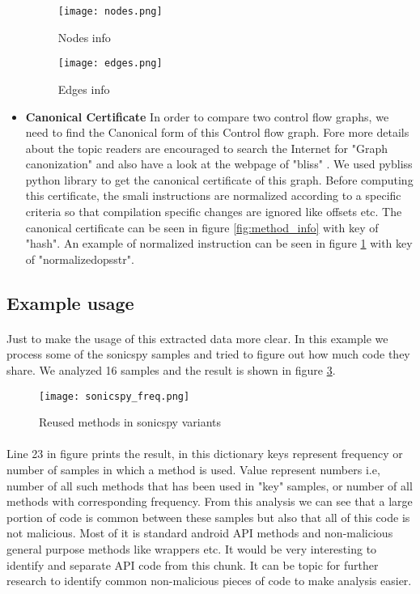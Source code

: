 \documentclass[../main.tex]{subfile}
\begin{document}
\begin{itemize}
			\begin{figure}
				\texttt{[image: nodes.png]}
				\caption{Nodes info}
				\label{fig:nodes_info}	
			\end{figure}

			\begin{figure}
				\texttt{[image: edges.png]}
				\caption{Edges info}
				\label{fig:edges_info}	
			\end{figure}
		

			\item \textbf{Canonical Certificate} In order to compare two control flow graphs, we need to find the Canonical form of this Control flow graph. Fore more details about the topic readers are encouraged to search the Internet for "Graph canonization" and also have a look at the webpage of "bliss" \cite{bliss}. We used pybliss python library \cite{bliss} \cite{junttila2007engineering} to get the canonical certificate of this graph. Before computing this certificate, the smali instructions are normalized according to a specific criteria so that compilation specific changes are ignored like offsets etc. The canonical certificate can be seen in figure \ref{fig:method_info} with key of "hash". An example of normalized instruction can be seen in figure \ref{fig:nodes_info} with key of "normalized\textunderscore ops\textunderscore str".
		\end{itemize}
		
		\subsection{Example usage}
		\paragraph{}Just to make the usage of this extracted data more clear. In this example we process some of the sonicspy samples and tried to figure out how much code they share. We analyzed 16 samples and the result is shown in figure \ref{fig:sonicspy_freq}.
		
		\begin{figure}
			\texttt{[image: sonicspy\_freq.png]}
			\caption{Reused methods in sonicspy variants}
			\label{fig:sonicspy_freq}
		\end{figure}
		\paragraph{} Line 23 in figure prints the result, in this dictionary keys represent frequency or number of samples in which a method is used. Value represent numbers i.e, number of all such methods that has been used in "key" samples, or number of all methods with corresponding frequency. From this analysis we can see that a large portion of code is common between these samples but also that all of this code is not malicious. Most of it is standard android API methods and non-malicious general purpose methods like wrappers etc. It would be very interesting to identify and separate API code from this chunk. It can be topic for further research to identify common non-malicious pieces of code to make analysis easier. 
\end{document}
